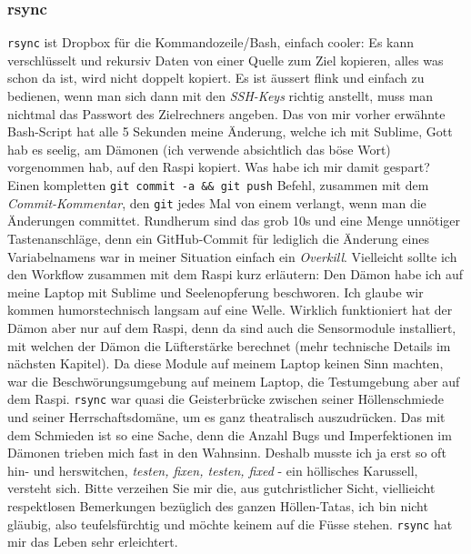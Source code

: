 \documentclass[12pt,titlepage,a4paper]{article}
\begin{document}
\subsubsection{rsync}
\verb^rsync^ ist Dropbox für die Kommandozeile/Bash, einfach cooler: Es kann verschlüsselt und rekursiv Daten von einer Quelle zum Ziel kopieren, alles was schon da ist, wird nicht doppelt kopiert. Es ist äussert flink und einfach zu bedienen, wenn man sich dann mit den \textit{SSH-Keys} richtig anstellt, muss man nichtmal das Passwort des Zielrechners angeben. Das von mir vorher erwähnte Bash-Script hat alle 5 Sekunden meine Änderung, welche ich mit Sublime, Gott hab es seelig, am Dämonen (ich verwende absichtlich das böse Wort) vorgenommen hab, auf den Raspi kopiert. Was habe ich mir damit gespart? Einen kompletten  \verb^git commit -a && git push^ Befehl, zusammen mit dem \textit{Commit-Kommentar}, den \verb&git& jedes Mal von einem verlangt, wenn man die Änderungen committet. Rundherum sind das grob 10s und eine Menge unnötiger Tastenanschläge, denn ein GitHub-Commit für lediglich die Änderung eines Variabelnamens war in meiner Situation einfach ein \textit{Overkill}. Vielleicht sollte ich den Workflow zusammen mit dem Raspi kurz erläutern: Den Dämon habe ich auf meine Laptop mit Sublime und Seelenopferung beschworen. Ich glaube wir kommen humorstechnisch langsam auf eine Welle. Wirklich funktioniert hat der Dämon aber nur auf dem Raspi, denn da sind auch die Sensormodule installiert, mit welchen der Dämon die Lüfterstärke berechnet (mehr technische Details im nächsten Kapitel). Da diese Module auf meinem Laptop keinen Sinn machten, war die Beschwörungsumgebung auf meinem Laptop, die Testumgebung aber auf dem Raspi. \verb^rsync^ war quasi die Geisterbrücke zwischen seiner Höllenschmiede und seiner Herrschaftsdomäne, um es ganz theatralisch auszudrücken. Das mit dem Schmieden ist so eine Sache, denn die Anzahl Bugs und Imperfektionen im Dämonen trieben mich fast in den Wahnsinn. Deshalb musste ich ja erst so oft hin- und herswitchen, \textit{testen, fixen, testen, fixed} - ein höllisches Karussell, versteht sich. Bitte verzeihen Sie mir die, aus gutchristlicher Sicht, viellieicht respektlosen Bemerkungen bezüglich des ganzen Höllen-Tatas, ich bin nicht gläubig, also teufelsfürchtig und möchte keinem auf die Füsse stehen. \verb^rsync^ hat mir das Leben sehr erleichtert.
\end{document}
